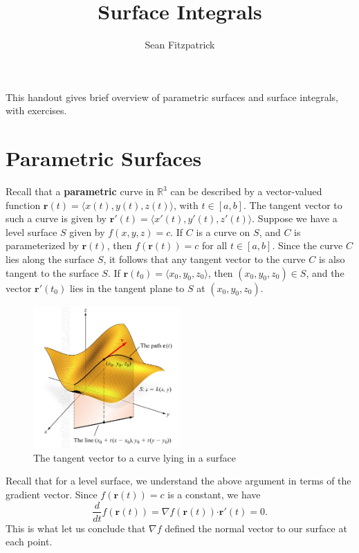 \documentclass[12pt,letterpaper]{article}
\author{Sean Fitzpatrick}
\title{Surface Integrals}
\newcommand{\dotp}{\boldsymbol{\cdot}}
\newcommand{\R}{\mathbb{R}}
\renewcommand{\r}{\mathbf{r}}
\begin{document}
\maketitle

This handout gives brief overview of parametric surfaces and surface integrals, with exercises.

\section{Parametric Surfaces}
Recall that a \textbf{parametric} curve in $\R^3$ can be described by a vector-valued function $\r(t) = \langle x(t), y(t), z(t)\rangle$, with $t\in [a,b]$. The tangent vector to such a curve is given by $\r'(t)=\langle x'(t), y'(t), z'(t)\rangle$. Suppose we have a level surface $S$ given by $f(x,y,z)=c$. If $C$ is a curve on $S$, and $C$ is parameterized by $\r(t)$, then $f(\r(t))=c$ for all $t\in [a,b]$. Since the curve $C$ lies along the surface $S$, it follows that any tangent vector to the curve $C$ is also tangent to the surface $S$. If $\r(t_0)=\langle x_0,y_0,z_0\rangle$, then $(x_0,y_0,z_0)\in S$, and the vector $\r'(t_0)$ lies in the tangent plane to $S$ at $(x_0, y_0, z_0)$.

\begin{figure}[h]
\begin{center}
\includegraphics[width=0.5\textwidth]{curve_surf.png}
\end{center}
\caption{The tangent vector to a curve lying in a surface}
\end{figure}


Recall that for a level surface, we understand the above argument in terms of the gradient vector. Since $f(\r(t))=c$ is a constant, we have
\[
 \frac{d}{dt}f(\r(t)) = \nabla f(\r(t))\dotp \r'(t) = 0.
\]
This is what let us conclude that $\nabla f$ defined the normal vector to our surface at each point.
\end{document}
